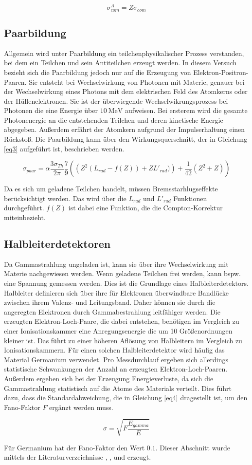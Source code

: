 \begin{equation}
    \sigma^A_{com} = Z \sigma_{com}
\end{equation}

\subsection{Paarbildung}
Allgemein wird unter Paarbildung ein teilchenphysikalischer Prozess verstanden, bei dem 
ein Teilchen und sein Antiteilchen erzeugt werden. In diesem Versuch bezieht sich die 
Paarbildung jedoch nur auf die Erzeugung von Elektron-Positron-Paaren. 
Sie entsteht bei Wechselwirkung von Photonen mit Materie, genauer bei der 
Wechselwirkung eines Photons mit dem elektrischen Feld des Atomkerns oder der 
Hüllenelektronen. 
Sie ist der überwiegende Wechselwikrungsprozess bei Photonen die eine Energie
über $\SI{10}{\mega\electronvolt}$ aufweisen.
Bei ersterem wird die gesamte Photonenergie an die 
entstehenden Teilchen und deren kinetische Energie abgegeben. Außerdem erfährt 
der Atomkern aufgrund der Impulserhaltung einen Rückstoß.
Die Paarbildung kann über den 
Wirkungsquerschnitt, der in Gleichung \ref{eq3} aufgeführt ist, beschrieben werden.

\begin{equation}
    \sigma_{paar} = \alpha \frac{3 \sigma_{Th}}{2 \pi} \frac{7}{9} \left( \left( Z^2 (L_{rad} - f(Z)) + Z L'_{rad}) \right) + \frac{1}{42} \left(Z^2 + Z \right) \right)
    \label{eq3}
\end{equation}

Da es sich um geladene Teilchen handelt, müssen Bremsstarhlugseffekte berücksichtigt 
werden. Das wird über die $L_{rad}$ und $L'_{rad}$ Funktionen durchgeführt. 
$f(Z)$ ist dabei eine Funktion, die die Compton-Korrektur miteinbezieht.

\subsection{Halbleiterdetektoren}
Da Gammastrahlung ungeladen ist, kann sie über ihre Wechselwirkung mit Materie 
nachgewiesen werden. Wenn geladene Teilchen frei werden, kann bspw. eine 
Spannung gemessen werden. Dies ist die Grundlage eines Halbleiterdetektors.
Halbleiter definieren sich über ihre für Elektronen überwindbare 
Bandlücke zwischen ihrem Valenz- und Leitungsband. Daher können sie durch die 
angeregten Elektronen durch Gammabestrahlung leitfähiger werden. 
Die erzeugten Elektron-Loch-Paare, die dabei entstehen, benötigen im Vergleich zu einer 
Ionisationskammer eine Anregungsenergie die um 10 Größenordnungen kleiner ist. 
Das führt zu einer höheren Aflösung von Halbleitern im Vergleich zu Ionisationskammern.
Für einen solchen Halbleiterdetektor wird häufig das Material Germanium verwendet.
Pro Messdurchlauf ergeben sich allerdings statistische Schwankungen der Anzahl an 
erzeugten Elektron-Loch-Paaren. Außerdem ergeben sich bei der Erzeugung Energieverluste,
da sich die Gammastrahlung statistisch auf die Atome des Materials verteilt.
Dies führt dazu, dass die Standardabweichung, die in Gleichung \ref{eq4} dragestellt ist,
um den Fano-Faktor $F$ ergänzt werden muss.

\begin{equation}
    \sigma = \sqrt{F \frac{E_{gamma}}{E}}
    \label{eq4}
\end{equation}

Für Germanium hat der Fano-Faktor den Wert $\num{0,1}$.
Dieser Abschnitt wurde mittels der Literaturverzeichnisse \cite{lit1},
\cite{lit2}, \cite{lit3} und \cite{lit4} erzeugt.
